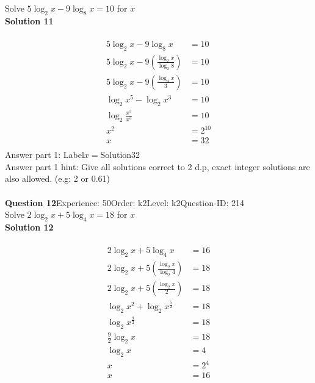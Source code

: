 \documentclass{article}
\begin{document}
Solve $5\log_{2}x-9\log_{8}x=10$ for $x$\\[4pt]
\noindent\textbf{Solution 11}\\[2pt]
\\[-35pt]\begin{align*}
5\log_{2}x-9\log_{8}x&=10\\[2pt]
5\log_{2}x-9\left(\displaystyle\frac{\log_{2}x}{\log_{2}8}\right)&=10\\[2pt]
5\log_{2}x-9\left(\displaystyle\frac{\log_{4}x}{3}\right)&=10\\[2pt]
\log_{2}x^5-\log_{2}x^3&=10\\[2pt]
\log_{2}\displaystyle\frac{x^5}{x^3}&=10\\[2pt]
x^2&=2^{10}\\[2pt]
x&=32\\[2pt]
\end{align*}
Answer part 1: \hspace{10pt}Label\hspace{10pt}$x=$\hspace{10pt}Solution\hspace{10pt}32\\
Answer part 1 hint: \hspace{15pt}Give all solutions correct to 2 d.p, exact integer solutions are also allowed. (e.g: 2 or 0.61)\\
\\[4pt]
\noindent\textbf{Question 12}\hspace{20pt}Experience: 50\hspace{20pt}Order: k2\hspace{20pt}Level: k2\hspace{20pt}Question-ID: 214\\[2pt]
Solve $2\log_{2}x+5\log_{4}x=18$ for $x$\\[4pt]
\noindent\textbf{Solution 12}\\[2pt]
\\[-35pt]\begin{align*}
2\log_{2}x+5\log_{4}x&=16\\[2pt]
2\log_{2}x+5\left(\displaystyle\frac{\log_{2}x}{\log_{2}4}\right)&=18\\[2pt]
2\log_{2}x+5\left(\displaystyle\frac{\log_{2}x}{2}\right)&=18\\[2pt]
\log_{2}x^2+\log_{2}x^{\frac{5}{2}}&=18\\[2pt]
\log_{2}x^{\frac{9}{2}}&=18\\[2pt]
\displaystyle\frac{9}{2}\log_{2}x&=18\\[2pt]
\log_{2}x&=4\\[2pt]
x&=2^{4}\\[2pt]
x&=16
\end{align*}
\end{document}
